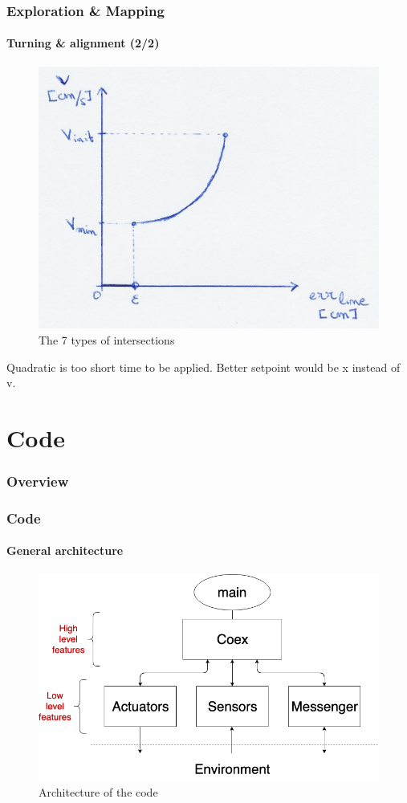 \documentclass[10pt]{beamer}
\begin{document}
\begin{frame}
\frametitle{Exploration \& Mapping}
\framesubtitle{Turning \& alignment (2/2)}
\begin{figure}[hbtp]
\centering
\label{fig:type-intersection}
\includegraphics[scale=0.07]{figures/turn-align}
\caption{The 7 types of intersections}
\end{figure}
Quadratic is too short time to be applied. Better setpoint would be x instead of v.
\end{frame}

\section{Code} 

\begin{frame}
\frametitle{Overview}
\tableofcontents[currentsection,subsectionstyle=shaded]
\end{frame}

\begin{frame}
\frametitle{Code}
\framesubtitle{General architecture}
\begin{figure}[hbtp]
\centering
\label{fig:architecture}
\includegraphics[scale=0.38]{figures/architecture.png}
\caption{Architecture of the code}
\end{figure}
\end{frame}
\end{document}
